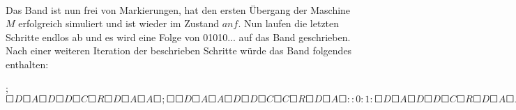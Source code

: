 \documentclass[10pt, a4paper]{article}
\begin{document}
\paragraph{}
Das Band ist nun frei von Markierungen, hat den ersten Übergang der Maschine $M$ erfolgreich simuliert und ist wieder im Zustand $anf$. Nun laufen die letzten Schritte endlos ab und es wird eine Folge von 01010... auf das Band geschrieben.\\
Nach einer weiteren Iteration der beschrieben Schritte würde das Band folgendes enthalten: \par
\begin{small}
;$\Square D\Square A\Square D\Square D\Square C\Square R\Square D\Square A\Square A\Square ;\Square \Square D\Square A\Square A\Square D\Square D\Square C\Square C\Square R\Square D\Square A\Square :: 0 : 1: \Square D \Square A \Square D\Square D\Square C\Square  R\Square D\Square A \Square A \Square$\\
\end{small}\par
\end{document}
